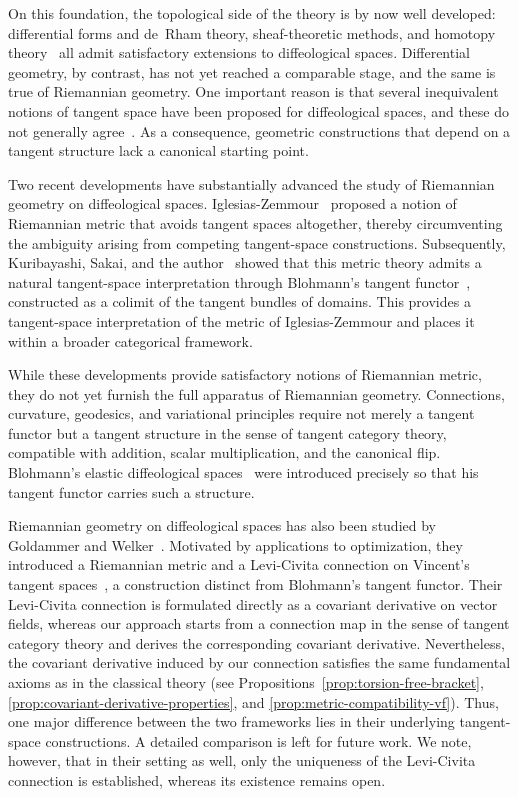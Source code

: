\documentclass{amsart}
\theoremstyle{definition}
\begin{document}
On this foundation, the topological side of the theory is by now well developed: differential forms and de~Rham theory, sheaf-theoretic methods, and homotopy theory~\cite{Kihara} all admit satisfactory extensions to diffeological spaces. Differential geometry, by contrast, has not yet reached a comparable stage, and the same is true of Riemannian geometry. One important reason is that several inequivalent notions of tangent space have been proposed for diffeological spaces, and these do not generally agree~\cite{Taho}. As a consequence, geometric constructions that depend on a tangent structure lack a canonical starting point.

Two recent developments have substantially advanced the study of Riemannian geometry on diffeological spaces. Iglesias-Zemmour~\cite{PIZ25} proposed a notion of Riemannian metric that avoids tangent spaces altogether, thereby circumventing the ambiguity arising from competing tangent-space constructions. Subsequently, Kuribayashi, Sakai, and the author~\cite{KSS} showed that this metric theory admits a natural tangent-space interpretation through Blohmann's tangent functor~\cite{B23}, constructed as a colimit of the tangent bundles of domains. This provides a tangent-space interpretation of the metric of Iglesias-Zemmour and places it within a broader categorical framework.

While these developments provide satisfactory notions of Riemannian metric, they do not yet furnish the full apparatus of Riemannian geometry. Connections, curvature, geodesics, and variational principles require not merely a tangent functor but a tangent structure in the sense of tangent category theory, compatible with addition, scalar multiplication, and the canonical flip. Blohmann's elastic diffeological spaces~\cite{B23} were introduced precisely so that his tangent functor carries such a structure.

Riemannian geometry on diffeological spaces has also been studied by Goldammer and Welker~\cite{GW}. Motivated by applications to optimization, they introduced a Riemannian metric and a Levi-Civita connection on Vincent's tangent spaces~\cite{V}, a construction distinct from Blohmann's tangent functor. Their Levi-Civita connection is formulated directly as a covariant derivative on vector fields, whereas our approach starts from a connection map in the sense of tangent category theory and derives the corresponding covariant derivative. Nevertheless, the covariant derivative induced by our connection satisfies the same fundamental axioms as in the classical theory (see Propositions~\ref{prop:torsion-free-bracket}, \ref{prop:covariant-derivative-properties}, and \ref{prop:metric-compatibility-vf}). Thus, one major difference between the two frameworks lies in their underlying tangent-space constructions. A detailed comparison is left for future work. We note, however, that in their setting as well, only the uniqueness of the Levi-Civita connection is established, whereas its existence remains open.
\end{document}

